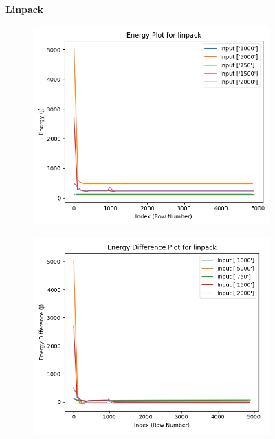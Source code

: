 \documentclass[times, 10pt,twocolumn]{article}
\begin{document}
\begin{figure}[ht]
   \textbf{Linpack}\par\medskip
   \begin{subfigure}[b]{0.3\textwidth}
      \includegraphics[width=\textwidth]{imgs/final_experiment_plots/model_analysis/measurement_data_analysis/linpack_energy.png}
     \caption{}
     \label{fig:linpack_energy}
   \end{subfigure}
   \hfill
   \begin{subfigure}[b]{0.3\textwidth}
      \includegraphics[width=\textwidth]{imgs/final_experiment_plots/model_analysis/measurement_data_analysis/linpack_energy_diff.png}

\end{subfigure}
\end{figure}
\end{document}
